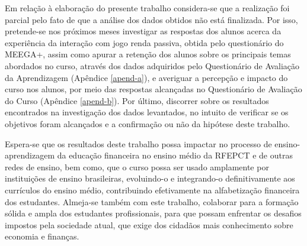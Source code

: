 Em relação à elaboração do presente trabalho considera-se que a realização foi parcial pelo fato de que a análise dos dados obtidos não está finalizada. Por isso, pretende-se nos próximos meses investigar as respostas dos alunos acerca da experiência da interação com jogo renda passiva, obtida pelo questionário do MEEGA+, assim como apurar a retenção dos alunos sobre os principais temas abordados no curso, através dos dados adquiridos pelo Questionário de Avaliação da Aprendizagem (Apêndice \ref{apend-a}), e averiguar a percepção e impacto do curso nos alunos, por meio das respostas alcançadas no Questionário de Avaliação do Curso (Apêndice \ref{apend-b}). Por último, discorrer sobre os resultados encontrados na investigação dos dados levantados, no intuito de verificar se os objetivos foram alcançados e a confirmação ou não da hipótese deste trabalho.

Espera-se que os resultados deste trabalho possa impactar no processo de ensino-aprendizagem da educação financeira no ensino médio da RFEPCT e de outras redes de ensino, bem como, que o curso possa ser usado amplamente por instituições de ensino brasileiras, evoluindo-o e integrando-o definitivamente aos currículos do ensino médio, contribuindo efetivamente na alfabetização financeira dos estudantes. Almeja-se também com este trabalho, colaborar para a formação sólida e ampla dos estudantes profissionais, para que possam enfrentar os desafios impostos pela sociedade atual, que exige dos cidadãos mais conhecimento sobre economia e finanças.


